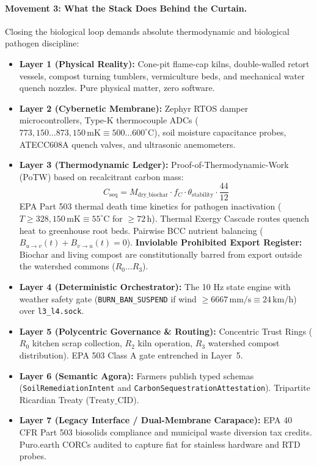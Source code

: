 \paragraph{Movement 3: What the Stack Does Behind the Curtain.}
Closing the biological loop demands absolute thermodynamic and biological pathogen discipline:
\begin{itemize}
    \item \textbf{Layer 1 (Physical Reality):} Cone-pit flame-cap kilns, double-walled retort vessels, compost turning tumblers, vermiculture beds, and mechanical water quench nozzles. Pure physical matter, zero software.
    \item \textbf{Layer 2 (Cybernetic Membrane):} Zephyr RTOS damper microcontrollers, Type-K thermocouple ADCs ($773{,}150\dots 873{,}150\,\mathrm{mK} \equiv 500\dots 600^\circ\mathrm{C}$), soil moisture capacitance probes, ATECC608A quench valves, and ultrasonic anemometers.
    \item \textbf{Layer 3 (Thermodynamic Ledger):} Proof-of-Thermodynamic-Work (PoTW) based on recalcitrant carbon mass:
    \[
    C_{\mathrm{seq}} = M_{\mathrm{dry\_biochar}} \cdot f_C \cdot \theta_{\mathrm{stability}} \cdot \frac{44}{12}
    \]
    EPA Part 503 thermal death time kinetics for pathogen inactivation ($T \ge 328{,}150\,\mathrm{mK} \equiv 55^\circ\mathrm{C}$ for $\ge 72\,\mathrm{h}$). Thermal Exergy Cascade routes quench heat to greenhouse root beds. Pairwise BCC nutrient balancing ($B_{u \to v}(t) + B_{v \to u}(t) = 0$). \textbf{Inviolable Prohibited Export Register:} Biochar and living compost are constitutionally barred from export outside the watershed commons ($R_0 \dots R_3$).
    \item \textbf{Layer 4 (Deterministic Orchestrator):} The 10 Hz state engine with weather safety gate (\texttt{BURN\_BAN\_SUSPEND} if wind $\ge 6667\,\mathrm{mm/s} \equiv 24\,\mathrm{km/h}$) over \texttt{l3\_l4.sock}.
    \item \textbf{Layer 5 (Polycentric Governance \& Routing):} Concentric Trust Rings ($R_0$ kitchen scrap collection, $R_2$ kiln operation, $R_3$ watershed compost distribution). EPA 503 Class A gate entrenched in Layer~5.
    \item \textbf{Layer 6 (Semantic Agora):} Farmers publish typed schemas (\texttt{SoilRemediationIntent} and \texttt{CarbonSequestrationAttestation}). Tripartite Ricardian Treaty ($\mathrm{Treaty\_CID}$).
    \item \textbf{Layer 7 (Legacy Interface / Dual-Membrane Carapace):} EPA 40 CFR Part 503 biosolids compliance and municipal waste diversion tax credits. Puro.earth CORCs audited to capture fiat for stainless hardware and RTD probes.
\end{itemize}

